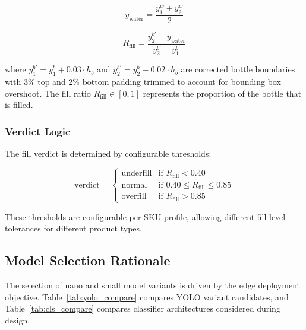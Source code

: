 \documentclass{ieeeaccess}
\begin{document}
\begin{equation}
y_{\text{water}} = \frac{y_1^w + y_2^w}{2}
\label{eq:water_y}
\end{equation}

\begin{equation}
R_{\text{fill}} = \frac{y_2^{b'} - y_{\text{water}}}{y_2^{b'} - y_1^{b'}}
\label{eq:fill_ratio}
\end{equation}

\noindent where $y_1^{b'} = y_1^b + 0.03 \cdot h_b$ and $y_2^{b'} = y_2^b - 0.02 \cdot h_b$ are corrected bottle boundaries with 3\% top and 2\% bottom padding trimmed to account for bounding box overshoot. The fill ratio $R_{\text{fill}} \in [0, 1]$ represents the proportion of the bottle that is filled.

\subsubsection{Verdict Logic}
The fill verdict is determined by configurable thresholds:

\begin{equation}
\text{verdict} = \begin{cases}
\text{underfill} & \text{if } R_{\text{fill}} < 0.40 \\
\text{normal} & \text{if } 0.40 \leq R_{\text{fill}} \leq 0.85 \\
\text{overfill} & \text{if } R_{\text{fill}} > 0.85
\end{cases}
\label{eq:fill_verdict}
\end{equation}

These thresholds are configurable per SKU profile, allowing different fill-level tolerances for different product types.


\subsection{Model Selection Rationale}

The selection of nano and small model variants is driven by the edge deployment objective. Table~\ref{tab:yolo_compare} compares YOLO variant candidates, and Table~\ref{tab:cls_compare} compares classifier architectures considered during design.
\end{document}
